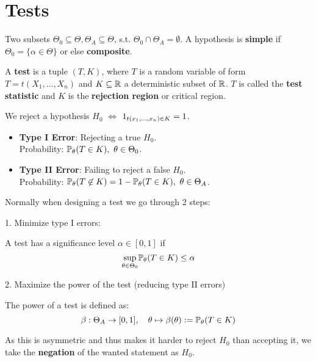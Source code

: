\section{Tests}
\begin{definition*}
  Two subsets \(\Theta_0 \subseteq \Theta, \Theta_A \subseteq \Theta\), s.t. \(\Theta_0 \cap \Theta_A = \emptyset\). A hypothesis is \textbf{simple} if \(\Theta_0 = \{\alpha \in \Theta\}\) or else \textbf{composite}.
\end{definition*}

\begin{definition*}[Test]
  A \textbf{test} is a tuple \((T, K)\), where \(T\) is a random variable of form \(T = t(X_1, \ldots, X_n)\) and \(K \subseteq \R\) a deterministic subset of \(\R\). \(T\) is called the \textbf{test statistic} and \(K\) is the \textbf{rejection region} or critical region. 
\end{definition*}

We reject a hypothesis \(H_0\) \(\iff\) \(\I_{t(x_1, \ldots, x_n) \in K} = 1\).

\begin{definition*}
  \begin{itemize}
    \item \textbf{Type I Error}: Rejecting a true \(H_0\). \\
    Probability: \(\P_\theta(T \in K), \ \theta \in \Theta_0\).
    \item \textbf{Type II Error}: Failing to reject a false \(H_0\). \\
    Probability: \(\P_\theta(T \not\in K) = 1 - \P_\theta(T \in K), \ \theta \in \Theta_A\).
  \end{itemize}
\end{definition*}

Normally when designing a test we go through 2 steps:

1. Minimize type I errors:
\begin{definition*}
  A test has a significance level \(\alpha \in [0, 1]\) if
  \[\underset{\theta \in \Theta_0}{\sup} \P_\theta(T \in K) \leq \alpha\]
\end{definition*}

2. Maximize the power of the test (reducing type II errors)
\begin{definition*}[Power]
  The power of a test is defined as:
  \[\beta: \Theta_A \to [0, 1], \quad \theta \mapsto \beta(\theta) := \P_\theta(T \in K)\]
\end{definition*}

As this is asymmetric and thus makes it harder to reject \(H_0\) than accepting it, we take the \textbf{negation} of the wanted statement as \(H_0\).
